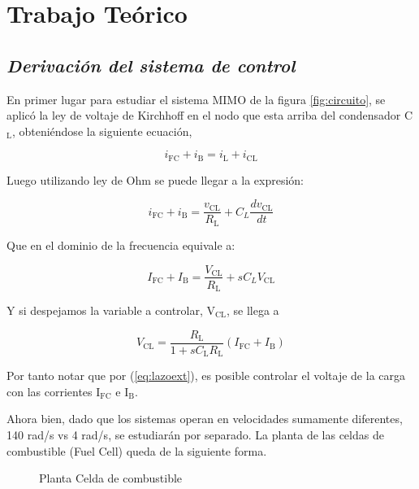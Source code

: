 \section{Trabajo Teórico}

\subsection{\textit{Derivación del sistema de control}}
En primer lugar para estudiar el sistema MIMO de la figura \ref{fig:circuito}, se aplicó 
la ley de voltaje de Kirchhoff en el nodo que esta arriba del condensador C$_{\text{L}}$, 
obteniéndose la siguiente ecuación,

\begin{equation}
    i_{\text{FC}} + i_{\text{B}} = i_{\text{L}} + i_{\text{CL}}
\end{equation}

Luego utilizando ley de Ohm se puede llegar a la expresión:

\begin{equation}
    i_{\text{FC}} + i_{\text{B}} = \frac{v_{\text{CL}}}{R_{\text{L}}} + C_{L}\frac{dv_{\text{CL}}}{dt}
\end{equation}

Que en el dominio de la frecuencia equivale a:

\begin{equation}
    I_{\text{FC}} + I_{\text{B}} = \frac{V_{\text{CL}}}{R_{\text{L}}} + sC_{L}V_{\text{CL}}
\end{equation}

Y si despejamos la variable a controlar, V$_{\text{CL}}$, se llega a

\begin{equation}
    V_{\text{CL}} = \frac{R_{\text{L}}}{1+sC_{\text{L}}R_{\text{L}}}(I_{\text{FC}}+I_{\text{B}})
    \label{eq:lazoext}
\end{equation}

Por tanto notar que por (\ref{eq:lazoext}), es posible controlar el voltaje de la carga 
con las corrientes I$_{\text{FC}}$ e I$_{\text{B}}$.

Ahora bien, dado que los sistemas operan en velocidades sumamente diferentes, 140 rad/s vs 4 rad/s,
se estudiarán por separado. La planta de las celdas de combustible (Fuel Cell) queda de la siguiente 
forma.
\begin{figure}[H] %
    \centering
    \caption{Planta Celda de combustible}
    \label{circ:planta_fc}
\end{figure}

